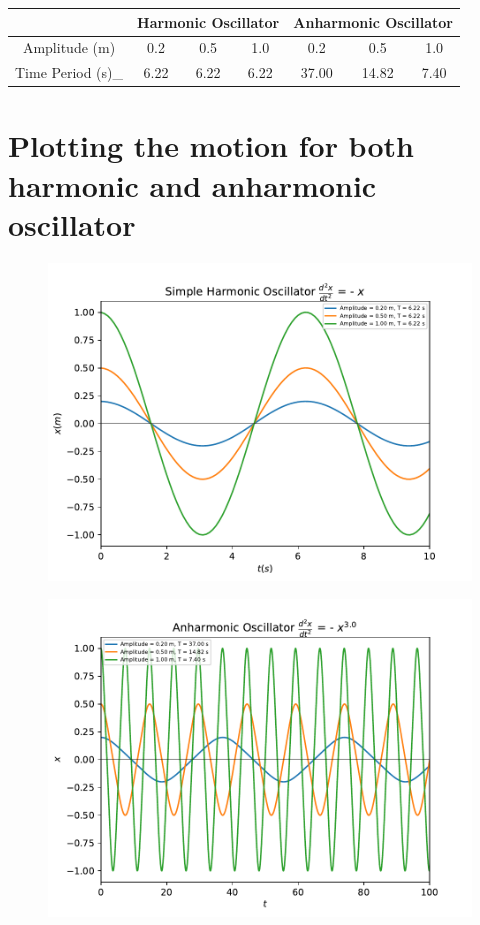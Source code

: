 \documentclass[a4paper,10pt]{article}
\begin{document}
\begin{center}
 \begin{longtable}{||c||c|c|c||c|c|c||}
 \hline
 & \multicolumn{3}{c||}{Harmonic Oscillator} & \multicolumn{3}{c||}{Anharmonic Oscillator} \\
 \hline
 Amplitude (m) & 0.2 & 0.5 & 1.0 & 0.2 & 0.5 & 1.0\\
 \hline
 Time Period (s)_& 6.22 & 6.22 & 6.22 & 37.00 & 14.82 & 7.40 \\
 \hline
 \end{longtable}
\end{center}

\section*{Plotting the motion for both harmonic and anharmonic oscillator}
\begin{figure}[H]
\centering
\includegraphics[scale=0.9]{harmonic_oscillator.pdf} 
\end{figure}

\begin{figure}[H]
\centering
\includegraphics[scale=0.9]{anharmonic_oscillator.pdf} 
\end{figure}
\end{document}

